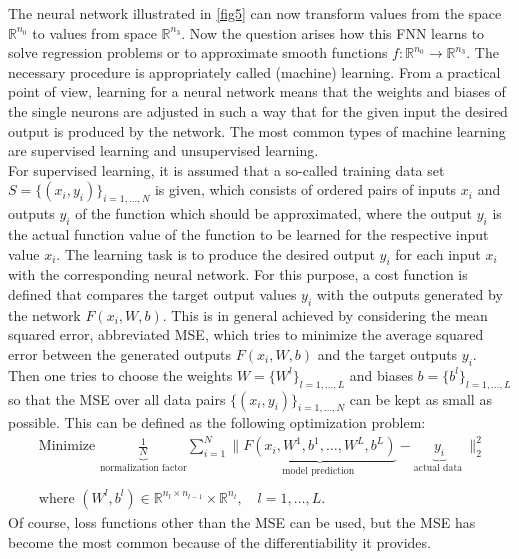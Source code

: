 The neural network illustrated in \cref{fig5} can now transform values from the space $\mathbb{R}^{n_0}$ to values from space $\mathbb{R}^{n_3}$. Now the question arises how this FNN learns to solve regression problems or to approximate smooth functions $f \colon \mathbb{R}^{n_0} \to \mathbb{R}^{n_3}$. The necessary procedure is appropriately called (machine) learning. From a practical point of view, learning for a neural network means that the weights and biases of the single neurons are adjusted in such a way that for the given input the desired output is produced by the network. The most common types of machine learning are supervised learning and unsupervised learning. \\
For supervised learning, it is assumed that a so-called training data set $S = \{ (x_i, y_i) \}_{i = 1, \ldots, N}$ is given, which consists of ordered pairs of inputs $x_i$ and outputs $y_i$ of the function which should be approximated, where the output $y_i$ is the actual function value of the function to be learned for the respective input value $x_i$. The learning task is to produce the desired output $y_i$ for each input $x_i$ with the corresponding neural network. For this purpose, a cost function is defined that compares the target output values $y_i$ with the outputs generated by the network $F(x_i, W, b)$. This is in general achieved by considering the mean squared error, abbreviated MSE, which tries to minimize the average squared error between the generated outputs $F(x_i, W, b)$ and the target outputs $y_i$. Then one tries to choose the weights $W = \{ W^l \}_{l = 1, \ldots, L}$ and biases $b = \{ b^l \}_{l = 1, \ldots, L}$ so that the MSE over all data pairs $\{ (x_i, y_i) \}_{i = 1, \ldots, N}$ can be kept as small as possible. This can be defined as the following optimization problem: 
\begin{equation*}
    \begin{gathered}
        \text{ Minimize } \underbrace{\frac{1}{N}}_{\text{normalization factor}} \sum_{i=1}^{N} \lVert \underbrace{F\left(x_{i}, W^{1}, b^{1}, \ldots, W^{L}, b^{L}\right)}_{\text{model prediction }} - \underbrace{y_{i}}_{\text{actual data }} \rVert^{2}_2 \\
        \\
        \text{ where }\left(W^{l}, b^{l}\right) \in \mathbb{R}^{n_l \times n_{l-1}} \times \mathbb{R}^{n_l}, \quad l=1, \ldots, L .
    \end{gathered}
\end{equation*}
Of course, loss functions other than the MSE can be used, but the MSE has become the most common because of the differentiability it provides. \\
